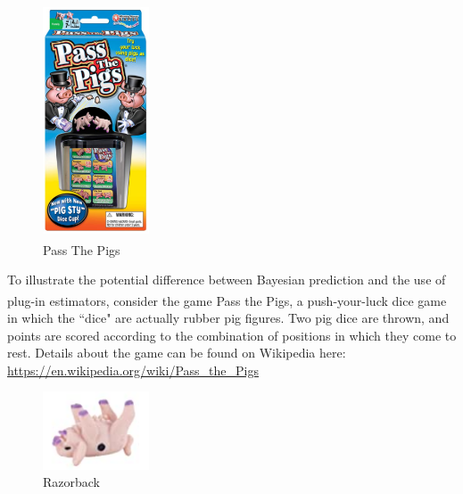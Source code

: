 \documentclass[12pt, a4paper]{article}
\begin{document}
\begin{figure}
  \begin{center}
    \includegraphics[width=0.28\textwidth]{./Graphics/PassThePigs/PtPBox}
  \end{center}
  \caption{Pass The Pigs\textsuperscript{\circledR}}
\end{figure}

\noindent To illustrate the potential difference between Bayesian prediction and the use of plug-in estimators, consider the game Pass the Pigs\textsuperscript{\circledR}, a push-your-luck dice game in which the ``dice" are actually rubber pig figures.  Two pig dice are thrown, and points are scored according to the combination of positions in which they come to rest.  Details about the game can be found on Wikipedia here: \url{https://en.wikipedia.org/wiki/Pass_the_Pigs}\\


\begin{figure}
  \begin{center}
    \includegraphics[width=0.28\textwidth]{./Graphics/PassThePigs/Razorback}
  \end{center}
  \caption{Razorback}
\end{figure}
\end{document}
